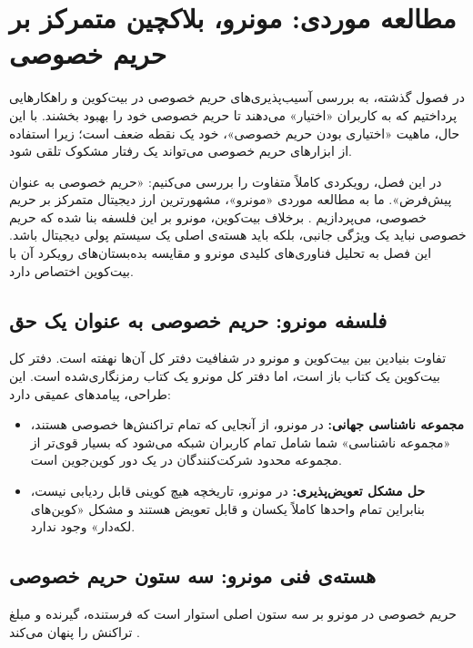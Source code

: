 \chapter{مطالعه موردی: مونرو، بلاکچین متمرکز بر حریم خصوصی}
\label{chap:case_study_monero}

در فصول گذشته، به بررسی آسیب‌پذیری‌های حریم خصوصی در بیت‌کوین و راهکارهایی پرداختیم که به کاربران «اختیار» می‌دهند تا حریم خصوصی خود را بهبود بخشند. با این حال، ماهیت «اختیاری بودن حریم خصوصی»، خود یک نقطه ضعف است؛ زیرا استفاده از ابزارهای حریم خصوصی می‌تواند یک رفتار مشکوک تلقی شود.

در این فصل، رویکردی کاملاً متفاوت را بررسی می‌کنیم: «حریم خصوصی به عنوان پیش‌فرض». ما به مطالعه موردی «مونرو»، مشهورترین ارز دیجیتال متمرکز بر حریم خصوصی، می‌پردازیم \cite{monero_website}. برخلاف بیت‌کوین، مونرو بر این فلسفه بنا شده که حریم خصوصی نباید یک ویژگی جانبی، بلکه باید هسته‌ی اصلی یک سیستم پولی دیجیتال باشد. این فصل به تحلیل فناوری‌های کلیدی مونرو و مقایسه بده‌بستان‌های رویکرد آن با بیت‌کوین اختصاص دارد.

\section{فلسفه مونرو: حریم خصوصی به عنوان یک حق}

تفاوت بنیادین بین بیت‌کوین و مونرو در شفافیت دفتر کل آن‌ها نهفته است. دفتر کل بیت‌کوین یک کتاب باز است، اما دفتر کل مونرو یک کتاب رمزنگاری‌شده است. این طراحی، پیامدهای عمیقی دارد:
\begin{itemize}
	\item \textbf{مجموعه ناشناسی جهانی:} در مونرو، از آنجایی که تمام تراکنش‌ها خصوصی هستند، «مجموعه ناشناسی» شما شامل تمام کاربران شبکه می‌شود که بسیار قوی‌تر از مجموعه محدود شرکت‌کنندگان در یک دور کوین‌جوین است.
	
	\item \textbf{حل مشکل تعویض‌پذیری:} در مونرو، تاریخچه هیچ کوینی قابل ردیابی نیست، بنابراین تمام واحدها کاملاً یکسان و قابل تعویض هستند و مشکل «کوین‌های لکه‌دار» وجود ندارد.
\end{itemize}

\section{هسته‌ی فنی مونرو: سه ستون حریم خصوصی}

حریم خصوصی در مونرو بر سه ستون اصلی استوار است که فرستنده، گیرنده و مبلغ تراکنش را پنهان می‌کند \cite{monero_website}.

